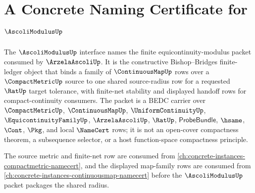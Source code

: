 \chapter{A Concrete Naming Certificate for $\AscoliModulusUp$}
\label{ch:concrete-instances-ascolimodulus-namecert}

The $\AscoliModulusUp$ interface names the finite equicontinuity-modulus packet consumed by $\ArzelaAscoliUp$. It is the constructive Bishop--Bridges finite-ledger object that binds a family of $\ContinuousMapUp$ rows over a $\CompactMetricUp$ source to one shared source-radius row for a requested $\RatUp$ target tolerance, with finite-net stability and displayed handoff rows for compact-continuity consumers. The packet is a BEDC carrier over $\CompactMetricUp$, $\ContinuousMapUp$, $\UniformContinuityUp$, $\EquicontinuityFamilyUp$, $\ArzelaAscoliUp$, $\RatUp$, $\mathsf{ProbeBundle}$, $\hsame$, $\Cont$, $\Pkg$, and local $\NameCert$ rows; it is not an open-cover compactness theorem, a subsequence selector, or a host function-space compactness principle.

The source metric and finite-net row are consumed from \autoref{ch:concrete-instances-compactmetric-namecert}, and the displayed map-family rows are consumed from \autoref{ch:concrete-instances-continuousmap-namecert} before the $\AscoliModulusUp$ packet packages the shared radius.

